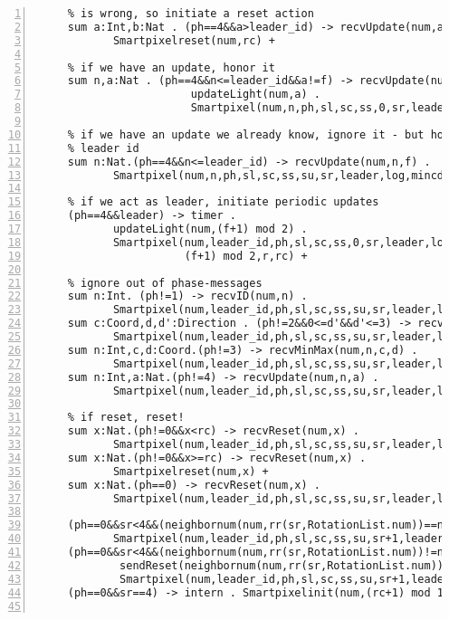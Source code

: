 \begin{Verbatim}[frame=lines,numbers=left,fontfamily=courier,fontsize=\footnotesize]
     % if we receive a new min/max coordinates from a higher different leader id, this
     % is wrong, so initiate a reset action
     sum a:Int,b:Nat . (ph==4&&a>leader_id) -> recvUpdate(num,a,b) . sendMonReset .
            Smartpixelreset(num,rc) +

     % if we have an update, honor it
     sum n,a:Nat . (ph==4&&n<=leader_id&&a!=f) -> recvUpdate(num,n,a) .
                        updateLight(num,a) .
                        Smartpixel(num,n,ph,sl,sc,ss,0,sr,leader,log,mincd,maxcd,a,r,rc) +

     % if we have an update we already know, ignore it - but honor a possibly lower
     % leader id
     sum n:Nat.(ph==4&&n<=leader_id) -> recvUpdate(num,n,f) .
            Smartpixel(num,n,ph,sl,sc,ss,su,sr,leader,log,mincd,maxcd,f,r,rc) +

     % if we act as leader, initiate periodic updates
     (ph==4&&leader) -> timer .
            updateLight(num,(f+1) mod 2) .
            Smartpixel(num,leader_id,ph,sl,sc,ss,0,sr,leader,log,mincd,maxcd,
                       (f+1) mod 2,r,rc) +

     % ignore out of phase-messages
     sum n:Int. (ph!=1) -> recvID(num,n) .
            Smartpixel(num,leader_id,ph,sl,sc,ss,su,sr,leader,log,mincd,maxcd,f,r,rc) +
     sum c:Coord,d,d':Direction . (ph!=2&&0<=d'&&d'<=3) -> recvCoord(num,c,d,d') .
            Smartpixel(num,leader_id,ph,sl,sc,ss,su,sr,leader,log,mincd,maxcd,f,r,rc) +
     sum n:Int,c,d:Coord.(ph!=3) -> recvMinMax(num,n,c,d) .
            Smartpixel(num,leader_id,ph,sl,sc,ss,su,sr,leader,log,mincd,maxcd,f,r,rc) +
     sum n:Int,a:Nat.(ph!=4) -> recvUpdate(num,n,a) .
            Smartpixel(num,leader_id,ph,sl,sc,ss,su,sr,leader,log,mincd,maxcd,f,r,rc) +

     % if reset, reset!
     sum x:Nat.(ph!=0&&x<rc) -> recvReset(num,x) .
            Smartpixel(num,leader_id,ph,sl,sc,ss,su,sr,leader,log,mincd,maxcd,f,r,rc) +
     sum x:Nat.(ph!=0&&x>=rc) -> recvReset(num,x) .
            Smartpixelreset(num,x) +
     sum x:Nat.(ph==0) -> recvReset(num,x) .
            Smartpixel(num,leader_id,ph,sl,sc,ss,su,sr,leader,log,mincd,maxcd,f,r,rc) +

     (ph==0&&sr<4&&(neighbornum(num,rr(sr,RotationList.num))==num)) -> intern .
            Smartpixel(num,leader_id,ph,sl,sc,ss,su,sr+1,leader,log,mincd,maxcd,f,r,rc) +
     (ph==0&&sr<4&&(neighbornum(num,rr(sr,RotationList.num))!=num)) ->
             sendReset(neighbornum(num,rr(sr,RotationList.num)),rc) .
             Smartpixel(num,leader_id,ph,sl,sc,ss,su,sr+1,leader,log,mincd,maxcd,f,r,rc) +
     (ph==0&&sr==4) -> intern . Smartpixelinit(num,(rc+1) mod 10);


\end{Verbatim}
